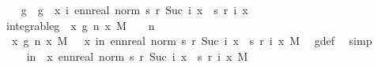 \begin{isabellebody}
\ \ \isamarkupfalse%
\ g{\isacharprime}{\kern0pt}\ \ {\isachardoublequoteopen}g{\isacharprime}{\kern0pt}\ {\isacharequal}{\kern0pt}\ {\isacharparenleft}{\kern0pt}{\isasymlambda}x{\isachardot}{\kern0pt}\ {\isasymSum}i{\isachardot}{\kern0pt}\ ennreal\ {\isacharparenleft}{\kern0pt}norm\ {\isacharparenleft}{\kern0pt}s\ {\isacharparenleft}{\kern0pt}r\ {\isacharparenleft}{\kern0pt}Suc\ i{\isacharparenright}{\kern0pt}{\isacharparenright}{\kern0pt}\ x\ {\isacharminus}{\kern0pt}\ s\ {\isacharparenleft}{\kern0pt}r\ i{\isacharparenright}{\kern0pt}\ x{\isacharparenright}{\kern0pt}{\isacharparenright}{\kern0pt}{\isacharparenright}{\kern0pt}{\isachardoublequoteclose}\isanewline
\isanewline
\ \ \isamarkupfalse%
\ integrable{\isacharunderscore}{\kern0pt}g{\isacharcolon}{\kern0pt}\ {\isachardoublequoteopen}{\isacharparenleft}{\kern0pt}{\isasymintegral}\isactrlsup {\isacharplus}{\kern0pt}\ x{\isachardot}{\kern0pt}\ g\ n\ x\ {\isasympartial}M{\isacharparenright}{\kern0pt}\ {\isacharless}{\kern0pt}\ {}{\isachardoublequoteclose}\ \ n\isanewline
\ \ \isamarkupfalse%
\ {\isacharminus}{\kern0pt}\isanewline
\ \ \ \ \isamarkupfalse%
\ {\isachardoublequoteopen}{\isacharparenleft}{\kern0pt}{\isasymintegral}\isactrlsup {\isacharplus}{\kern0pt}\ x{\isachardot}{\kern0pt}\ g\ n\ x\ {\isasympartial}M{\isacharparenright}{\kern0pt}\ {\isacharequal}{\kern0pt}\ {\isacharparenleft}{\kern0pt}{\isasymintegral}\isactrlsup {\isacharplus}{\kern0pt}\ x{\isachardot}{\kern0pt}\ {\isacharparenleft}{\kern0pt}{\isasymSum}i{\isasymle}n{\isachardot}{\kern0pt}\ ennreal\ {\isacharparenleft}{\kern0pt}norm\ {\isacharparenleft}{\kern0pt}s\ {\isacharparenleft}{\kern0pt}r\ {\isacharparenleft}{\kern0pt}Suc\ i{\isacharparenright}{\kern0pt}{\isacharparenright}{\kern0pt}\ x\ {\isacharminus}{\kern0pt}\ s\ {\isacharparenleft}{\kern0pt}r\ i{\isacharparenright}{\kern0pt}\ x{\isacharparenright}{\kern0pt}{\isacharparenright}{\kern0pt}{\isacharparenright}{\kern0pt}\ {\isasympartial}M{\isacharparenright}{\kern0pt}{\isachardoublequoteclose}\ \isamarkupfalse%
\ g{\isacharunderscore}{\kern0pt}def\ \isamarkupfalse%
\ simp\isanewline
\ \ \ \ \isamarkupfalse%
\ \isamarkupfalse%
\ {\isachardoublequoteopen}{\isachardot}{\kern0pt}{\isachardot}{\kern0pt}{\isachardot}{\kern0pt}\ {\isacharequal}{\kern0pt}\ {\isacharparenleft}{\kern0pt}{\isasymSum}i{\isasymle}n{\isachardot}{\kern0pt}\ {\isacharparenleft}{\kern0pt}{\isasymintegral}\isactrlsup {\isacharplus}{\kern0pt}\ x{\isachardot}{\kern0pt}\ ennreal\ {\isacharparenleft}{\kern0pt}norm\ {\isacharparenleft}{\kern0pt}s\ {\isacharparenleft}{\kern0pt}r\ {\isacharparenleft}{\kern0pt}Suc\ i{\isacharparenright}{\kern0pt}{\isacharparenright}{\kern0pt}\ x\ {\isacharminus}{\kern0pt}\ s\ {\isacharparenleft}{\kern0pt}r\ i{\isacharparenright}{\kern0pt}\ x{\isacharparenright}{\kern0pt}{\isacharparenright}{\kern0pt}\ {\isasympartial}M{\isacharparenright}{\kern0pt}{\isacharparenright}{\kern0pt}{\isachardoublequoteclose}\ \isamarkupfalse%

\end{isabellebody}
